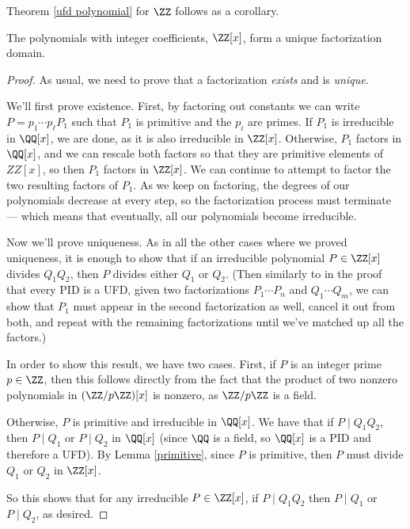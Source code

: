 Theorem \ref{ufd polynomial} for $\ZZ$ follows as a corollary.

\begin{corollary}
The polynomials with integer coefficients, $\ZZ[x]$, form a unique factorization domain.
\end{corollary}

\begin{proof}
As usual, we need to prove that a factorization \emph{exists} and is \emph{unique}. 

We'll first prove existence. First, by factoring out constants we can write $P = p_1\cdots p_{\ell} P_1$ such that $P_1$ is primitive and the $p_i$ are primes. If $P_1$ is irreducible in $\QQ[x]$, we are done, as it is also irreducible in $\ZZ[x]$. Otherwise, $P_1$ factors in $\QQ[x]$, and we can rescale both factors so that they are primitive elements of $ZZ[x]$, so then $P_1$ factors in $\ZZ[x]$. We can continue to attempt to factor the two resulting factors of $P_1$. As we keep on factoring, the degrees of our polynomials decrease at every step, so the factorization process must terminate --- which means that eventually, all our polynomials become irreducible. %
    
Now we'll prove uniqueness. As in all the other cases where we proved uniqueness, it is enough to show that if an irreducible polynomial $P \in \ZZ[x]$ divides $Q_1Q_2$, then $P$ divides either $Q_1$ or $Q_2$. (Then similarly to in the proof that every PID is a UFD, given two factorizations $P_1\cdots P_n$ and $Q_1\cdots Q_m$, we can show that $P_1$ must appear in the second factorization as well, cancel it out from both, and repeat with the remaining factorizations until we've matched up all the factors.)

In order to show this result, we have two cases. First, if $P$ is an integer prime $p \in \ZZ$, then this follows directly from the fact that the product of two nonzero polynomials in $(\ZZ/p\ZZ)[x]$ is nonzero, as $\ZZ/p\ZZ$ is a field. 
    
Otherwise, $P$ is primitive and irreducible in $\QQ[x]$. We have that if $P \mid Q_1Q_2$, then $P \mid Q_1$ or $P \mid Q_2$ in $\QQ[x]$ (since $\QQ$ is a field, so $\QQ[x]$ is a PID and therefore a UFD). By Lemma \ref{primitive}, since $P$ is primitive, then $P$ must divide $Q_1$ or $Q_2$ in $\ZZ[x]$. 

So this shows that for any irreducible $P \in \ZZ[x]$, if $P \mid Q_1Q_2$ then $P \mid Q_1$ or $P \mid Q_2$, as desired. 
\end{proof}


